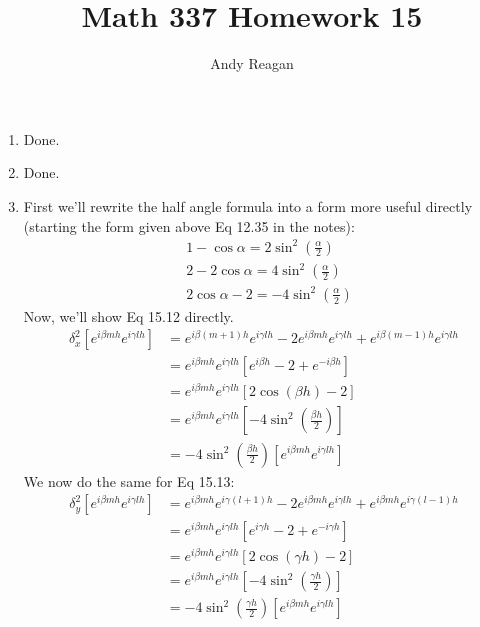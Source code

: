 \documentclass[11pt]{article}
\author{Andy Reagan}
\title{Math 337 Homework 15}
\def\f{\frac }
\begin{document}
\maketitle

\begin{enumerate}

\item Done.

\item Done.

\item First we'll rewrite the half angle formula into a form more useful directly (starting the form given above Eq 12.35 in the notes):
\begin{align*} & 1-\cos \alpha = 2 \sin ^2 \left ( \f{\alpha}{2} \right ) \\
&2-2\cos \alpha = 4 \sin ^2 \left ( \f{\alpha}{2} \right ) \\
&2\cos \alpha - 2= - 4 \sin ^2 \left ( \f{\alpha}{2} \right ) \end{align*}
Now, we'll show Eq 15.12 directly.
\begin{align*} \delta _x ^2 \left [ e^{i\beta m h} e^{i\gamma l h} \right ] &= e^{i\beta (m+1) h} e^{i\gamma l h} -2 e^{i\beta m h} e^{i\gamma l h} + e^{i\beta (m-1) h} e^{i\gamma l h}\\
&= e^{i\beta m h} e^{i\gamma l h} \left [ e^{i\beta h}-2  + e^{-i\beta h} \right ]\\
&= e^{i\beta m h} e^{i\gamma l h} \left [ 2\cos (\beta h) -2 \right ]\\
&= e^{i\beta m h} e^{i\gamma l h} \left [ -4 \sin ^2 \left ( \f{\beta h}{2} \right ) \right ]\\
&= -4 \sin ^2 \left ( \f{\beta h}{2} \right )  \left [ e^{i\beta m h} e^{i\gamma l h}\right ]\end{align*}
We now do the same for Eq 15.13:
\begin{align*} \delta _y ^2 \left [ e^{i\beta m h} e^{i\gamma l h} \right ] &= e^{i\beta m h} e^{i\gamma (l+1) h} -2 e^{i\beta m h} e^{i\gamma l h} + e^{i\beta m h} e^{i\gamma (l-1) h}\\
&= e^{i\beta m h} e^{i\gamma l h} \left [ e^{i\gamma h}-2  + e^{-i\gamma h} \right ]\\
&= e^{i\beta m h} e^{i\gamma l h} \left [ 2\cos (\gamma h) -2 \right ]\\
&= e^{i\beta m h} e^{i\gamma l h} \left [ -4 \sin ^2 \left ( \f{\gamma h}{2} \right ) \right ]\\
&= -4 \sin ^2 \left ( \f{\gamma h}{2} \right )  \left [ e^{i\beta m h} e^{i\gamma l h}\right ]\end{align*}


\end{enumerate}
\end{document}
